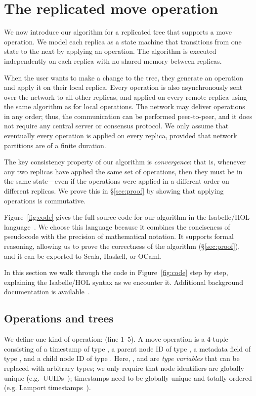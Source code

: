 \documentclass[sigplan,anonymous]{acmart}
\begin{document}
\section{The replicated move operation}\label{sec:algorithm}

We now introduce our algorithm for a replicated tree that supports a move operation.
We model each replica as a state machine that transitions from one state to the next by applying an operation.
The algorithm is executed independently on each replica with no shared memory between replicas.

When the user wants to make a change to the tree, they generate an operation and apply it on their local replica.
Every operation is also asynchronously sent over the network to all other replicas, and applied on every remote replica using the same algorithm as for local operations.
The network may deliver operations in any order; thus, the communication can be performed peer-to-peer, and it does not require any central server or consensus protocol.
We only assume that eventually every operation is applied on every replica, provided that network partitions are of a finite duration.

The key consistency property of our algorithm is \emph{convergence}: that is, whenever any two replicas have applied the same set of operations, then they must be in the same state---even if the operations were applied in a different order on different replicas.
We prove this in \S\ref{sec:proof} by showing that applying operations is commutative.

Figure~\ref{fig:code} gives the full source code for our algorithm in the Isabelle/HOL language~\cite{DBLP:conf/tphol/WenzelPN08}.
We choose this language because it combines the conciseness of pseudocode with the precision of mathematical notation.
It supports formal reasoning, allowing us to prove the correctness of the algorithm (\S\ref{sec:proof}), and it can be exported to Scala, Haskell, or OCaml.

In this section we walk through the code in Figure~\ref{fig:code} step by step, explaining the Isabelle/HOL syntax as we encounter it.
Additional background documentation is available~\cite{DBLP:books/sp/NipkowK14}.

\subsection{Operations and trees}\label{sec:ops-trees}

We define one kind of operation:  (line 1--5).
A move operation is a 4-tuple consisting of a timestamp  of type , a parent node ID  of type , a metadata field  of type , and a child node ID  of type .
Here, ,  and  are \emph{type variables} that can be replaced with arbitrary types; we only require that node identifiers  are globally unique (e.g.\ UUIDs~\cite{Leach:2005hm}); timestamps  need to be globally unique and totally ordered (e.g. Lamport timestamps~\cite{Lamport:1978jq}).
\end{document}
